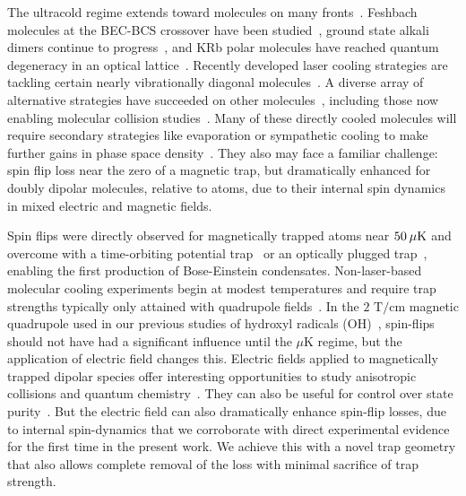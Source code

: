 \documentclass[%
 reprint,
 amsmath,amssymb,
 aps,
pra,
]{revtex4-1}
\newcommand{\s}{{\nobreak\hspace{.2em}}}
\begin{document}
The ultracold regime extends toward molecules on many fronts~\cite{Carr2009}.
Feshbach molecules at the BEC-BCS crossover have been studied~\cite{Greiner2003, Zwierlein2003, Jochim2003, Bourdel2004}, ground state alkali dimers continue to progress~\cite{Ni2008, Danzl2010, Takekoshi2014, Molony2014, Park2015, Guo2016, Drews2017, Liu2017, Rvachov2017},
and KRb polar molecules have reached quantum degeneracy in an optical lattice~\cite{Moses2015}.
Recently developed laser cooling strategies are tackling certain nearly vibrationally diagonal molecules~\cite{Stuhl2008, Hummon2013, Barry2014, Zhelyazkova2014, Hemmerling2016, Truppe2017}.
A diverse array of alternative strategies have succeeded on other molecules~\cite{Weinstein1998, Bethlem1999, Bochinski2003, Narevicius2008, Wiederkehr2012, Marx2015, Prehn2016, Liu2017a}, including those now enabling molecular collision studies~\cite{Sawyer2011, Zastrow2014, Klein2016, Wu2017}.
Many of these directly cooled molecules will require secondary strategies like evaporation or sympathetic cooling to make further gains in phase space density~\cite{Parazzoli2011, Stuhl2012evap, Quemener2016}.
They also may face a familiar challenge: spin flip loss near the zero of a magnetic trap, but dramatically enhanced for doubly dipolar molecules, relative to atoms, due to their internal spin dynamics in mixed electric and magnetic fields.

Spin flips were directly observed for magnetically trapped atoms near $50\s\mu\text{K}$ and overcome with a time-orbiting potential trap~\cite{Petrich1995} or an optically plugged trap~\cite{Davis1995}, enabling the first production of Bose-Einstein condensates.
Non-laser-based molecular cooling experiments begin at modest temperatures and require trap strengths typically only attained with quadrupole fields~\cite{Weinstein1998, Sawyer2008, Riedel2011, Quintero-Perez2014, Akerman2017}.
In the $2\text{ T/cm}$ magnetic quadrupole used in our previous studies of hydroxyl radicals (OH)~\cite{Stuhl2012evap}, spin-flips should not have had a significant influence until the $\mu$K regime, but the application of electric field changes this.
Electric fields applied to magnetically trapped dipolar species offer interesting opportunities to study anisotropic collisions and quantum chemistry~\cite{Stuhl2013}.
They can also be useful for control over state purity~\cite{Stuhl2012uwave}.
But the electric field can also dramatically enhance spin-flip losses, due to internal spin-dynamics that we corroborate with direct experimental evidence for the first time in the present work.
We achieve this with a novel trap geometry that also allows complete removal of the loss with minimal sacrifice of trap strength.
\end{document}
